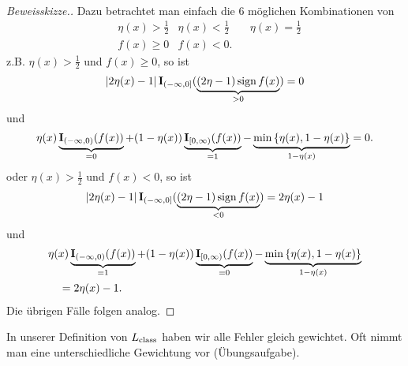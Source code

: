 \begin{bsp*}
\begin{align*}
\end{align*}
\begin{proof}[Beweisskizze.]
Dazu betrachtet man einfach die 6 möglichen Kombinationen von
\begin{align*}
&\eta(x) > \frac{1}{2} & \eta(x) < \frac{1}{2} && \eta(x) = \frac{1}{2}\\
& f(x) \ge 0 & f(x) < 0. 
\end{align*}
z.B. $\eta(x) > \frac{1}{2}$ und $f(x)\ge 0$, so ist
\begin{align*}
\left|2\eta(x)-1\right|\mathbf{I}_{(-\infty,0]}(\underbrace{(2\eta-1)\operatorname{sign} f(x)}_{>0})= 0
\end{align*}
und
\begin{align*}
\eta(x)\underbrace{\mathbf{I}_{(-\infty,0)}(f(x))}_{=0} +
(1-\eta(x))\underbrace{\mathbf{I}_{[0,\infty)}(f(x))}_{=1}
- \underbrace{\min\left\{ \eta(x),1-\eta(x) \right\}}_{1-\eta(x)} = 0.
\end{align*}
oder $\eta(x)>\frac{1}{2}$ und $f(x) < 0$, so ist
\begin{align*}
\left|2\eta(x)-1\right|\mathbf{I}_{(-\infty,0]}(\underbrace{(2\eta-1)\operatorname{sign} f(x)}_{<0}) =
2\eta(x)-1
\end{align*}
und
\begin{align*}
&\eta(x)\underbrace{\mathbf{I}_{(-\infty,0)}(f(x))}_{=1} +
(1-\eta(x))\underbrace{\mathbf{I}_{[0,\infty)}(f(x))}_{=0}
- \underbrace{\min\left\{ \eta(x),1-\eta(x) \right\}}_{1-\eta(x)} \\ &\quad = 2\eta(x)-1.
\end{align*}
Die übrigen Fälle folgen analog.\qedhere
\end{proof}

In unserer Definition von $L_{\mathrm{class}}$ haben wir alle Fehler gleich gewichtet.
Oft nimmt man eine unterschiedliche Gewichtung vor (Übungsaufgabe).\bsphere
\end{bsp*}

